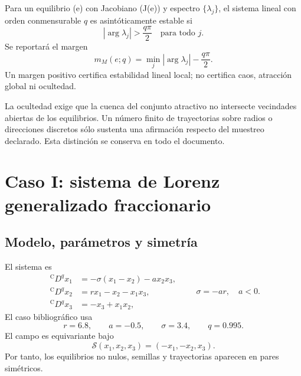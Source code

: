 Para un equilibrio (e) con Jacobiano (J(e)) y espectro
\(\{\lambda_j\}\), el sistema lineal con orden conmensurable \(q\) es
asintóticamente estable si
\begin{equation}
 |\arg\lambda_j|>\frac{q\pi}{2}
 \quad\text{para todo }j.
 \label{nc:eq:matignon}
\end{equation}
Se reportará el margen
\begin{equation}
 m_M(e;q)=\min_j|\arg\lambda_j|-\frac{q\pi}{2}.
 \label{nc:eq:margin}
\end{equation}
Un margen positivo certifica estabilidad lineal local; no certifica caos,
atracción global ni ocultedad.

La ocultedad exige que la cuenca del conjunto atractivo no intersecte
vecindades abiertas de los equilibrios. Un número finito de trayectorias sobre
radios o direcciones discretos sólo sustenta una afirmación respecto del
muestreo declarado. Esta distinción se conserva en todo el documento.

\clearpage
\section[Caso I: Lorenz generalizado fraccionario]
{Caso I: sistema de Lorenz generalizado fraccionario}

\subsection{Modelo, parámetros y simetría}

El sistema es
\begin{equation}
\begin{aligned}
 {}^{\mathrm C}D^qx_1&=-\sigma(x_1-x_2)-a x_2x_3,\\
 {}^{\mathrm C}D^qx_2&=r x_1-x_2-x_1x_3,\\
 {}^{\mathrm C}D^qx_3&=-x_3+x_1x_2,
\end{aligned}
 \qquad \sigma=-ar,\quad a<0.
\label{nc:eq:lorenz-model}
\end{equation}
El caso bibliográfico usa
\begin{equation}
 r=6.8,\qquad a=-0.5,\qquad \sigma=3.4,
 \qquad q=0.995.
 \label{nc:eq:lorenz-parameters}
\end{equation}
El campo es equivariante bajo
\begin{equation}
 \mathcal S(x_1,x_2,x_3)=(-x_1,-x_2,x_3).
 \label{nc:eq:lorenz-symmetry}
\end{equation}
Por tanto, los equilibrios no nulos, semillas y trayectorias aparecen en pares
simétricos.

